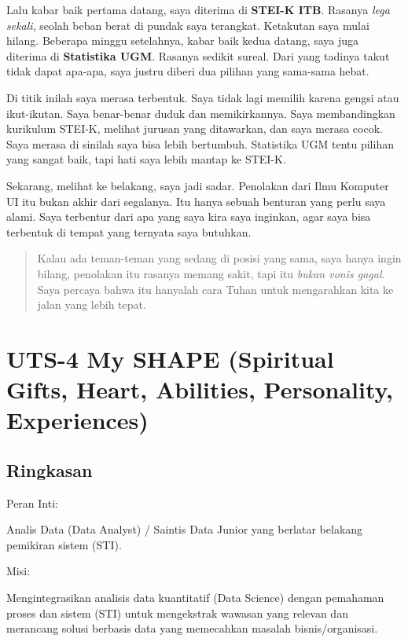 \documentclass[
  letterpaper,
  DIV=11,
  numbers=noendperiod]{scrreprt}
\begin{document}
Lalu kabar baik pertama datang, saya diterima di \textbf{STEI-K ITB}.
Rasanya \emph{lega sekali}, seolah beban berat di pundak saya terangkat.
Ketakutan saya mulai hilang. Beberapa minggu setelahnya, kabar baik
kedua datang, saya juga diterima di \textbf{Statistika UGM}. Rasanya
sedikit sureal. Dari yang tadinya takut tidak dapat apa-apa, saya justru
diberi dua pilihan yang sama-sama hebat.

Di titik inilah saya merasa terbentuk. Saya tidak lagi memilih karena
gengsi atau ikut-ikutan. Saya benar-benar duduk dan memikirkannya. Saya
membandingkan kurikulum STEI-K, melihat jurusan yang ditawarkan, dan
saya merasa cocok. Saya merasa di sinilah saya bisa lebih bertumbuh.
Statistika UGM tentu pilihan yang sangat baik, tapi hati saya lebih
mantap ke STEI-K.

Sekarang, melihat ke belakang, saya jadi sadar. Penolakan dari Ilmu
Komputer UI itu bukan akhir dari segalanya. Itu hanya sebuah benturan
yang perlu saya alami. Saya terbentur dari apa yang saya kira saya
inginkan, agar saya bisa terbentuk di tempat yang ternyata saya
butuhkan.

\begin{quote}
Kalau ada teman-teman yang sedang di posisi yang sama, saya hanya ingin
bilang, penolakan itu rasanya memang sakit, tapi itu \emph{bukan vonis
gagal}. Saya percaya bahwa itu hanyalah cara Tuhan untuk mengarahkan
kita ke jalan yang lebih tepat.
\end{quote}


\chapter{UTS-4 My SHAPE (Spiritual Gifts, Heart, Abilities, Personality,
Experiences)}\label{uts-4-my-shape-spiritual-gifts-heart-abilities-personality-experiences}

\section{Ringkasan}\label{ringkasan}

Peran Inti:

Analis Data (Data Analyst) / Saintis Data Junior yang berlatar belakang
pemikiran sistem (STI).

Misi:

Mengintegrasikan analisis data kuantitatif (Data Science) dengan
pemahaman proses dan sistem (STI) untuk mengekstrak wawasan yang relevan
dan merancang solusi berbasis data yang memecahkan masalah
bisnis/organisasi.
\end{document}
